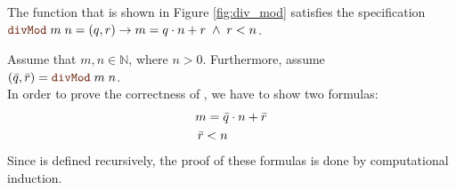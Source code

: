 \exampleEng
The function  that is shown in Figure \ref{fig:div_mod} satisfies the specification
\\[0.2cm]
\hspace*{1.3cm}
$\mytt{divMod}\;m\;n = (q, r)  \rightarrow m = q \cdot n + r \;\wedge\; r < n$. \eox



\proof
Assume that $m,n \in \mathbb{N}$, where $n > 0$.  Furthermore, assume
\\[0.2cm]
\hspace*{1.3cm}
$(\bar{q}, \bar{r}) = \mytt{divMod}\;m\;n$.
\\[0.2cm] 
In order to prove the correctness of , we have to show two formulas:
\begin{align}
m = \bar{q} \cdot n + \bar{r} \label{divmod1} \\
\bar{r} < n \hspace*{1.1cm} \label{divmod2}
\end{align}
Since  is defined recursively, the proof of these formulas is done by computational induction.
